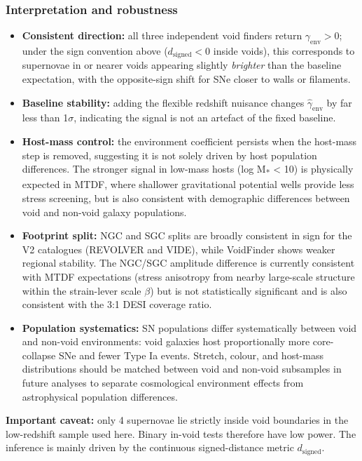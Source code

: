 \documentclass[11pt,a4paper]{article}
\begin{document}
\subsubsection{Interpretation and robustness}
\begin{itemize}
  \item \textbf{Consistent direction:} all three independent void finders return \(\gamma_{\mathrm{env}} > 0\); under the sign convention above (\(d_{\mathrm{signed}} < 0\) inside voids), this corresponds to supernovae in or nearer voids appearing slightly \emph{brighter} than the baseline expectation, with the opposite-sign shift for SNe closer to walls or filaments.
  \item \textbf{Baseline stability:} adding the flexible redshift nuisance changes \(\hat\gamma_{\mathrm{env}}\) by far less than 1\(\sigma\), indicating the signal is not an artefact of the fixed baseline.
  \item \textbf{Host-mass control:} the environment coefficient persists when the host-mass step is removed, suggesting it is not solely driven by host population differences. The stronger signal in low-mass hosts (log M\textsubscript{*} < 10) is physically expected in MTDF, where shallower gravitational potential wells provide less stress screening, but is also consistent with demographic differences between void and non-void galaxy populations.
  \item \textbf{Footprint split:} NGC and SGC splits are broadly consistent in sign for the V2 catalogues (REVOLVER and VIDE), while VoidFinder shows weaker regional stability. The NGC/\allowbreak{}SGC amplitude difference is currently consistent with MTDF expectations (stress anisotropy from nearby large-scale structure within the strain-lever scale $\beta$) but is not statistically significant and is also consistent with the 3:1 DESI coverage ratio.
  \item \textbf{Population systematics:} SN populations differ systematically between void and non-void environments: void galaxies host proportionally more core-collapse SNe and fewer Type Ia events. Stretch, colour, and host-mass distributions should be matched between void and non-void subsamples in future analyses to separate cosmological environment effects from astrophysical population differences.
\end{itemize}

\begin{mdframed}[linecolor=accent,linewidth=0.5pt,backgroundcolor=callout-bg,leftline=true,rightline=true,topline=true,bottomline=true,innerleftmargin=8pt,innerrightmargin=8pt,innertopmargin=6pt,innerbottommargin=6pt]
\textbf{Important caveat:} only 4 supernovae lie strictly inside void boundaries in the low-redshift sample used here. Binary in-void tests therefore have low power.
The inference is mainly driven by the continuous signed-distance metric \(d_{\mathrm{signed}}\).
\end{mdframed}
\end{document}
